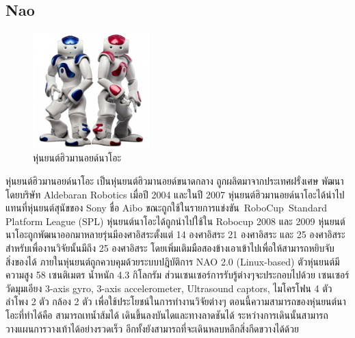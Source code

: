 \subsection*{Nao}
\begin{figure}[htbp]
    \centering
    \includegraphics[width=0.4\textwidth]{chapter2/images/nao.jpg}
    \caption{หุ่นยนต์ฮิวมานอยด์นาโอะ}
    \label{fig:nao_humanoid}
\end{figure}
\hspace*{10mm} หุ่นยนต์ฮิวมานอยด์นาโอะ เป็นหุ่นยนต์ฮิวมานอยด์ขนาดกลาง ถูกผลิตมาจากประเทศฝรั่งเศษ พัฒนาโดยบริษัท Aldebaran Robotics เมื่อปี 2004 และในปี 2007
หุ่นยนต์ฮิวมานอยด์นาโอะได้นำไปแทนที่หุ่นยนต์สุนัขของ Sony ชื่อ Aibo ขณะถูกใช้ในรายการแข่งขัน RoboCup Standard Platform League (SPL) หุ่นยนต์นาโอะได้ถูกนำไปใช้ใน Robocup 2008 และ 2009 
หุ่นยนต์นาโอะถูกพัฒนาออกมาหลายรุ่นมีองศาอิสระตั้งแต่ 14 องศาอิสระ 21 องศาอิสระ และ 25 องศาอิสระ สำหรับเพื่องานวิจัยนั้นมีถึง 25 องศาอิสระ
โดยเพิ่มเติมมือสองข้างเอาเข้าไปเพื่อให้สามารถหยิบจับสิ่งของได้ ภายในหุ่นยนต์ถูกควบคุมด้วยระบบปฎิบัติการ NAO 2.0 (Linux-based) ตัวหุ่นยนต์มีความสูง 58 เซนติเมตร 
น้ำหนัก 4.3 กิโลกรัม ส่วนเซนเซอร์การรับรู้ต่างๆจะประกอบไปด้วย เซนเซอร์วัดมุมเอียง 3-axis gyro, 3-axis accelerometer, Ultrasound captors, ไมโครโฟน 4 ตัว ลำโพง 2 ตัว กล้อง 2 ตัว เพื่อใช้ประโยชน์ในการทำงานวิจัยต่างๆ
ตอนนี้ความสามารถของหุ่นยนต์นาโอะที่ทำได้คือ สามารถเทน้ำส้มได้ เดินขึ้นลงบันไดและทางลาดชันได้ ระหว่างการเดินนั้นสามารถวางแผนการวางเท้าได้อย่างรวดเร็ว
อีกทั้งยังสามารถที่จะเดินหลบหลีกสิ่งกีดขวางได้ด้วย

\clearpage

